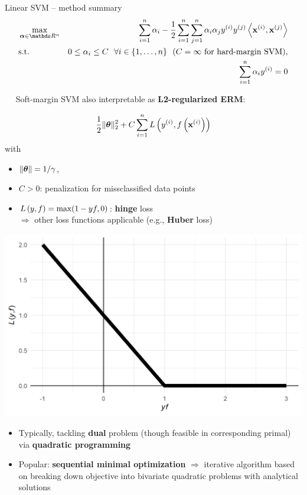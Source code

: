 \begin{vbframe}{Linear SVM -- method summary}
\begin{eqnarray*}
    & \max\limits_{\alphav \in \R^n} & \dualobj \\
    & \text{s.t. } & 0 \le \alpha_i \le C ~~ \forall i \in \nset ~~ (C = \infty
    \text{ for hard-margin SVM)}, \\
    & \quad & \sum_{i=1}^n \alpha_i \yi = 0
\end{eqnarray*}

\medskip

 ~~ Soft-margin SVM also interpretable as 
\textbf{L2-regularized ERM}: 

\begin{minipage}[b]{0.58\textwidth}
  $$ \frac{1}{2} \|\bm{\theta}\|_2^2 + C \sum\limits_{i=1}^n L\left(y^{(i)}, f\left(\mathbf{x}^{(i)}\right)\right)$$ 
  with  
  \begin{itemize}
    \item $\|\bm{\theta}\| = 1 / \gamma$,\\
    \item $C > 0$: penalization for missclassified data points
    \item $L\left(y, f\right) = \max(1-yf, 0)$: \textbf{hinge} loss \\
    $\Rightarrow$ other loss functions applicable (e.g., \textbf{Huber} loss)
  \end{itemize}
\end{minipage}
\begin{minipage}[b]{0.4\textwidth}
  \centering
  \includegraphics[height=0.4\textwidth, keepaspectratio=true]{
  figure/plot-hinge-loss.png}
\end{minipage}

\framebreak


\begin{itemize}
  \item Typically, tackling \textbf{dual} problem (though feasible 
  in corresponding primal) via \textbf{quadratic programming}
  \item Popular: \textbf{sequential minimal optimization} $\Rightarrow$ 
  iterative algorithm based on breaking down objective into bivariate quadratic 
  problems with analytical solutions
\end{itemize}
\medskip


\end{vbframe}
